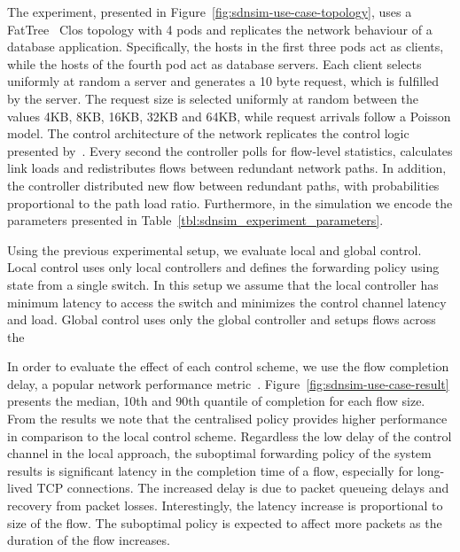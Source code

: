 The experiment, presented in Figure~\ref{fig:sdnsim-use-case-topology}, uses a
FatTree~ Clos topology with 4 pods and replicates the network
behaviour of a database application. Specifically,  the hosts in the first three
pods act as clients, while the hosts of the fourth pod act as database servers.
Each client selects uniformly at random a server  and generates a 10 byte
request, which is fulfilled by the server. The request size is selected
uniformly at random between the values 4KB, 8KB, 16KB, 32KB and 64KB\@, while
request arrivals follow a Poisson model. The control architecture of the network
replicates the control logic presented by~.  Every second the
controller polls for flow-level statistics, calculates link loads and
redistributes flows between redundant network paths. In addition, the controller
distributed new flow between redundant paths, with probabilities proportional to
the path load ratio. Furthermore, in the simulation we encode the parameters
presented in Table~\ref{tbl:sdnsim_experiment_parameters}.

Using the previous experimental setup, we evaluate local and global control.
Local control uses only local controllers and defines the forwarding policy 
using state from a single switch. In this setup we assume that the local
controller has minimum latency to access the switch and minimizes the control
channel latency and load. Global control uses only the global controller and
setups flows across the 


In order to evaluate the effect of each control scheme, we use the flow
completion delay, a popular network performance metric~. 
Figure~\ref{fig:sdnsim-use-case-result} presents the median, 10th and 90th
quantile of completion for each flow size. From the results we note that the
centralised policy provides higher performance in comparison to the local
control scheme. Regardless the low delay of the control channel in the local
approach, the suboptimal forwarding policy of the system results is significant
latency in the completion time of a flow, especially for long-lived TCP
connections. The increased delay is due to packet queueing delays and recovery
from packet losses.  Interestingly, the latency increase is proportional to size
of the flow. The suboptimal policy is expected to affect more packets as the
duration of the flow increases. 


